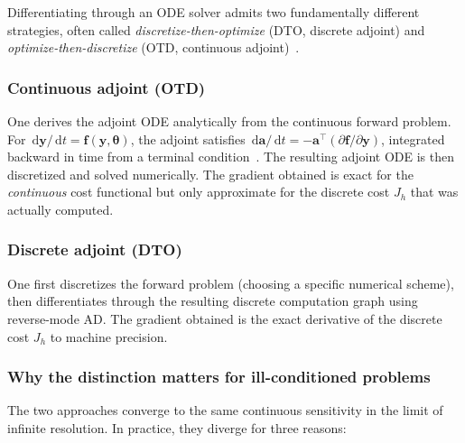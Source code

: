 \documentclass[11pt,a4paper]{article}
\newcommand{\vect}[1]{\bm{#1}}
\newcommand{\dd}{\,\mathrm{d}}
\theoremstyle{definition}
\begin{document}
Differentiating through an ODE solver admits two fundamentally different
strategies, often called \emph{discretize-then-optimize} (DTO, discrete
adjoint) and \emph{optimize-then-discretize} (OTD, continuous
adjoint)~\cite{giles2000}.

\subsubsection{Continuous adjoint (OTD)}

One derives the adjoint ODE analytically from the continuous forward
problem.  For $\dd\vect{y}/\dd t = \vect{f}(\vect{y}, \vect{\theta})$,
the adjoint satisfies
$\dd\vect{a}/\dd t = -\vect{a}^\top (\partial\vect{f}/\partial\vect{y})$,
integrated backward in time from a terminal
condition~\cite{pontryagin1962,chen2018neural}.  The resulting adjoint
ODE is then discretized and solved numerically.  The gradient obtained
is exact for the \emph{continuous} cost functional but only approximate
for the discrete cost $J_h$ that was actually computed.

\subsubsection{Discrete adjoint (DTO)}

One first discretizes the forward problem (choosing a specific numerical
scheme), then differentiates through the resulting discrete computation
graph using reverse-mode AD.  The gradient obtained is the exact
derivative of the discrete cost $J_h$ to machine precision.

\subsubsection{Why the distinction matters for ill-conditioned problems}

The two approaches converge to the same continuous sensitivity in the
limit of infinite resolution.  In practice, they diverge for three
reasons:
\end{document}
